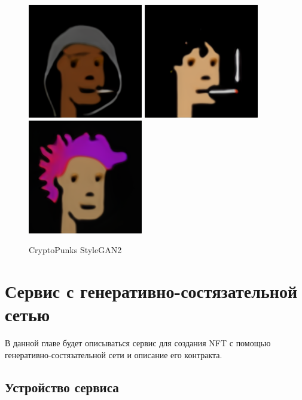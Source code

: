 \begin{figure}
    \centering
    \includegraphics[height=50mm, width=.3\textwidth]{fig/cryptopunk_seed0085.png}\hfill
    \includegraphics[height=50mm, width=.3\textwidth]{fig/cryptopunk_seed0090.png}\hfill
    \includegraphics[height=50mm, width=.3\textwidth]{fig/cryptopunk_seed0265.png}
    \caption{CryptoPunks StyleGAN2}
    \label{fig.cryptopunks_images_stylegan2}
\end{figure}

\section{Сервис с генеративно-состязательной сетью}
\label{section.ganservice}
  В данной главе будет описываться сервис для создания NFT с помощью генеративно-состязательной сети и описание его контракта.
\subsection{Устройство сервиса}

